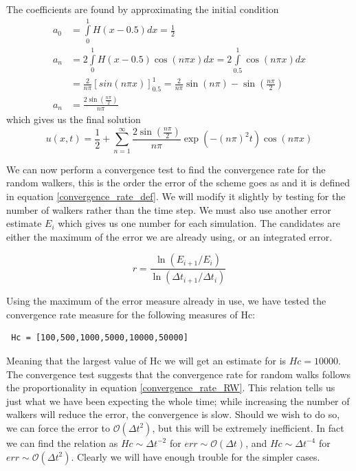 The coefficients are found by approximating the initial condition
\begin{align*}
 a_0 &= \int\limits_0^1H(x-0.5)dx = \frac{1}{2} \\
 a_n &= 2\int\limits_0^1H(x-0.5)\cos(n\pi x)dx = 2\int\limits_{0.5}^1\cos(n\pi x)dx \\
 &= \frac{2}{n\pi}\left[sin(n\pi x)\right]_{0.5}^1 = \frac{2}{n\pi}\sin(n\pi) - \sin(\frac{n\pi}{2}) \\
 a_n &= \frac{2\sin(\frac{n\pi}{2})}{n\pi}
\end{align*}
which gives us the final solution
\begin{equation}
 u(x,t) = \frac{1}{2} + \sum\limits_{n=1}^\infty \frac{2\sin(\frac{n\pi}{2})}{n\pi}\exp\left(-(n\pi)^2t\right)\cos(n\pi x)
\end{equation}

We can now perform a convergence test to find the convergence rate for the random walkers, this is the order the error of the scheme goes as and it is defined in equation \ref{convergence_rate_def}. 
We will modify it slightly by testing for the number of walkers rather than the time step. 
We must also use another error estimate $E_i$ which gives us one number for each simulation. 
The candidates are either the maximum of the error we are already using, or an integrated error.

\begin{equation}\label{convergence_rate_def}
 r = \frac{\ln(E_{i+1}/E_i)}{\ln(\Delta t_{i+1}/\Delta t_i)}
\end{equation}

Using the maximum of the error measure already in use, we have tested the convergence rate measure for the following measures of Hc:
\begin{lstlisting}
 Hc = [100,500,1000,5000,10000,50000]
\end{lstlisting}
Meaning that the largest value of Hc we will get an estimate for is $Hc = 10000$. 
The convergence test suggests that the convergence rate for random walks follows the proportionality in equation \ref{convergence_rate_RW}. 
This relation tells us just what we have been expecting the whole time; while increasing the number of walkers will reduce the error, the convergence is slow. 
Should we wish to do so, we can force the error to $\mathcal{O}(\Delta t^2)$, but this will be extremely inefficient. In fact we can find the relation as $Hc\sim\Delta t^{-2}$ for $err\sim\mathcal{O}(\Delta t)$, and $Hc\sim\Delta t^{-4}$ for $err\sim\mathcal{O}(\Delta t^2)$. Clearly we will have enough trouble for the simpler cases.


